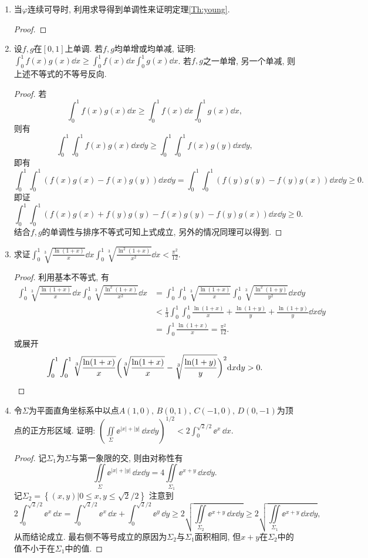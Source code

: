 \begin{quiza}
\begin{enumerate}
\item 当\(\varphi\)连续可导时, 利用求导得到单调性来证明定理\ref{Th:young}.
\begin{proof}

\end{proof}

\item 设\(f,g\)在\([0,1]\)上单调. 若\(f,g\)均单增或均单减, 
证明: \(\int_0^1f(x)g(x)\dd x\geqslant\int_{0}^{1}f(x)\dd x\int_{0}^{1}g(x)\dd x\). 
若\(f,g\)之一单增, 另一个单减, 则上述不等式的不等号反向.
\begin{proof}
若\[\int_{0}^{1}f(x)g(x)\dd x
\geqslant\int_{0}^{1}f(x)\dd x\int_{0}^{1}g(x)\dd x,\]
则有\[\int_{0}^{1}\int_{0}^{1}f(x)g(x)\dd x\dd y
\geqslant\int_{0}^{1}\int_{0}^{1}f(x)g(y)\dd x\dd y,\]
即有\[\int_{0}^{1}\int_{0}^{1}\left(f(x)g(x)-f(x)g(y)\right)\dd x\dd y
=\int_{0}^{1}\int_{0}^{1}\left(f(y)g(y)-f(y)g(x)\right)\dd x\dd y\geqslant 0.\]
即证\[\int_{0}^{1}\int_{0}^{1}\left(f(x)g(x)+f(y)g(y)-f(x)g(y)-f(y)g(x)\right)\dd x\dd y\geqslant 0.\]
结合\(f,g\)的单调性与排序不等式可知上式成立, 另外的情况同理可以得到.
\end{proof}

\item 求证\(\int_{0}^{1}\sqrt[3]{\frac{\ln(1+x)}{x}}\dd x\int_{0}^{1}\sqrt[3]{\frac{\ln^2(1+x)}{x^2}}\dd x<\frac{\pi^2}{12}\).
\begin{proof}
利用基本不等式, 有\[\begin{split}
\int_{0}^{1}\sqrt[3]{\frac{\ln (1+x)}{x}}\dd x\int_{0}^{1}\sqrt[3]{\frac{\ln^2(1+x)}{x^2}}\dd x
&=\int_{0}^{1}\int_{0}^{1}\sqrt[3]{\frac{\ln (1+x)}{x}}\int_{0}^{1}\sqrt[3]{\frac{\ln^2(1+y)}{y^2}}\dd x\dd y\\
&<\frac{1}{3}\int_{0}^{1}\int_{0}^{1}\frac{\ln(1+x)}{x}+\frac{\ln(1+y)}{y}+\frac{\ln(1+y)}{y}\dd x\dd y\\
&=\int_{0}^{1}\frac{\ln(1+x)}{x}=\frac{\pi^2}{12}.
\end{split}\]
或展开\[\int_0^1\int_0^1\sqrt[3]{\frac{\ln(1+x)}{x}}\bigg(\sqrt[3]{\frac{\ln(1+x)}{x}}-\sqrt[3]{\frac{\ln(1+y)}{y}}\bigg)^2\mathrm{d} x\mathrm{d} y>0.\qedhere\]
\end{proof}

\item 令\(\varSigma\)为平面直角坐标系中以点\(A(1,0),\,B(0,1),\,C(-1,0),\,D(0,-1)\)为顶点的正方形区域. 
证明: \(\left(\iint\limits_\varSigma\ee^{|x|+|y|}\,\dd x\dd y\right)^{1/2}
<2\int_{0}^{\sqrt{2}/2}\ee^x\,\dd x\).
\begin{proof}
记\(\varSigma_1\)为\(\varSigma\)与第一象限的交, 则由对称性有
\[\iint\limits_\varSigma\ee^{|x|+|y|}\,\dd x\dd y
=4\iint\limits_{\varSigma_1}\ee^{x+y}\,\dd x\dd y.\]
记\(\varSigma_2=\left\lbrace(x,y)\big|0\leqslant x,y\leqslant\sqrt{2}/2\right\rbrace\)
注意到\[2\int_{0}^{\sqrt{2}/2}\ee^x\,\dd x
=\int_{0}^{\sqrt{2}/2}\ee^x\,\dd x+\int_{0}^{\sqrt{2}/2}\ee^y\,\dd y
\geqslant 2\sqrt{\iint\limits_{\varSigma_2}\ee^{x+y}\,\dd x\dd y}
\geqslant 2\sqrt{\iint\limits_{\varSigma_1}\ee^{x+y}\,\dd x\dd y},\]
从而结论成立. 最右侧不等号成立的原因为\(\varSigma_2\)与\(\varSigma_1\)面积相同, 
但\(x+y\)在\(\varSigma_2\)中的值不小于在\(\varSigma_1\)中的值.
\end{proof}


\end{enumerate}
\end{quiza}
